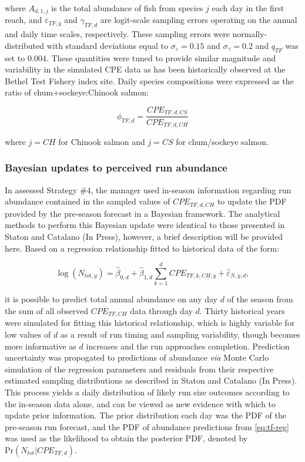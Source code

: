 \documentclass[12pt,]{book}
\theoremstyle{definition}
\theoremstyle{definition}
\theoremstyle{definition}
\theoremstyle{remark}
\begin{document}
\noindent
where \(A_{d,1,j}\) is the total abundance of fish from species \(j\)
each day in the first reach, and \(\varepsilon_{TF,y}\) and
\(\gamma_{TF,d}\) are logit-scale sampling errors operating on the
annual and daily time scales, respectively. These sampling errors were
normally-distributed with standard deviations equal to
\(\sigma_{\varepsilon} = 0.15\) and \(\sigma_{\gamma} = 0.2\) and
\(q_{TF}\) was set to 0.004. These quantities were tuned to provide
similar magnitude and variability in the simulated CPE data as has been
historically observed at the Bethel Test Fishery index site. Daily
species compositions were expressed as the ratio of chum+sockeye:Chinook
salmon:

\begin{equation}
  \phi_{TF,d} = \frac{CPE_{TF,d,CS}}{CPE_{TF,d,CH}}
  \label{eq:get-tf-ratio}
\end{equation}

\noindent
where \(j = CH\) for Chinook salmon and \(j = CS\) for chum/sockeye
salmon.

\subsubsection{Bayesian updates to perceived run
abundance}\label{bayes-updates}

\noindent
In assessed Strategy \#4, the manager used in-season information
regarding run abundance contained in the sampled values of
\(CPE_{TF,d,CH}\) to update the PDF provided by the pre-season forecast
in a Bayesian framework. The analytical methods to perform this Bayesian
update were identical to those presented in Staton and Catalano (In
Press), however, a brief description will be provided here. Based on a
regression relationship fitted to historical data of the form:

\begin{equation}
  \log(N_{tot,y}) = \hat{\beta}_{0,d} + \hat{\beta}_{1,d}\sum_{k=1}^d{CPE_{TF,k,CH,y}} + \hat{\varepsilon}_{N,y,d},
  \label{eq:tf-reg}
\end{equation}

\noindent
it is possible to predict total annual abundance on any day \(d\) of the
season from the sum of all observed \(CPE_{TF,CH}\) data through day
\(d\). Thirty historical years were simulated for fitting this
historical relationship, which is highly variable for low values of
\(d\) as a result of run timing and sampling variability, though becomes
more informative as \(d\) increases and the run approaches completion.
Prediction uncertainty was propogated to predictions of abundance
\emph{via} Monte Carlo simulation of the regression parameters and
residuals from their respective estimated sampling distributions as
described in Staton and Catalano (In Press). This process yields a daily
distribution of likely run size outcomes according to the in-season data
alone, and can be viewed as new evidence with which to update prior
information. The prior distribution each day was the PDF of the
pre-season run forecast, and the PDF of abundance predictions from
\eqref{eq:tf-reg} was used as the likelihood to obtain the posterior PDF,
denoted by \(\text{Pr}(N_{tot}|CPE_{TF,d})\).
\end{document}
